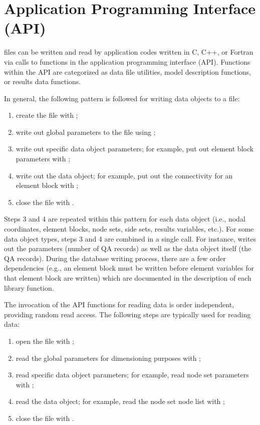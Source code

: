 \chapter{Application Programming Interface (API)}


\exo{} files can be written and read by application codes
written in C, C++, or Fortran via calls to functions in the application
programming interface (API). Functions within the API are categorized
as data file utilities, model description functions, or results
data functions.

In general, the following pattern is followed for writing
data objects to a file:

\begin{enumerate}
\item create the file with ;
\item write out global parameters to the file using ;
\item write out specific data object parameters; for example,
put out element block parameters with ;
\item write out the data object; for example, put out the connectivity
for an element block with ;
\item close the file with .
\end{enumerate}

Steps 3 and 4 are repeated within this pattern for each data object
(i.e., nodal coordinates, element blocks, node sets, side sets,
results variables, etc.). For some data object types, steps 3 and 4
are combined in a single call. For instance, 
writes out the parameters (number of QA records) as well as the data
object itself (the QA records). During the database writing process,
there are a few order dependencies (e.g., an element block must be
written before element variables for that element block are written)
which are documented in the description of each library function.


The invocation of the \exo{} API functions for reading
data is order independent, providing random read access. The
following steps are typically used for reading data:

\begin{enumerate}

\item open the file with ;

\item read the global parameters for dimensioning purposes with
;

\item read specific data object parameters; for example, read
node set parameters with ;

\item read the data object; for example, read the node set node
list with ;

\item close the file with .
\end{enumerate}

